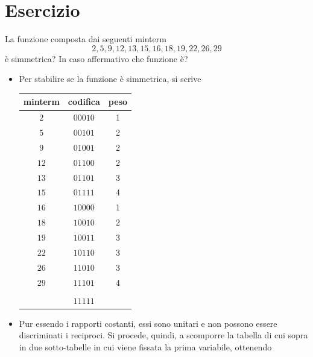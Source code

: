 \documentclass[a4paper]{extarticle}
\renewcommand\arraystretch{}
\begin{document}
\noindent
\section{Esercizio}
La funzione composta dai seguenti minterm
\[2, 5, 9, 12 ,13 ,15 ,16 ,18 ,19 ,22 ,26 ,29\]
è simmetrica? In caso affermativo che funzione è?

\begin{itemize}
    \item Per stabilire se la funzione è simmetrica, si scrive

    \noindent
    \begin{table}[H]
    \setlength{\tabcolsep}{4pt}
    \renewcommand{\arraystretch}{1}
    \centering
    \begin{tabular}{|c|c|c|}
        minterm & codifica & peso\\
        \hline
        $2$ & $00010$ & 1\\
        $5$ & $00101$ & 2\\
        $9$ & $01001$ & 2\\
        $12$ & $01100$ & 2\\
        $13$ & $01101$ & 3\\
        $15$ & $01111$ & 4\\
        $16$ & $10000$ & 1\\
        $18$ & $10010$ & 2\\
        $19$ & $10011$ & 3\\
        $22$ & $10110$ & 3\\
        $26$ & $11010$ & 3\\
        $29$ & $11101$ & 4\\
        \hline
         & & \\
         & $11111$ & \\
    \end{tabular}
    \end{table}

    \item Pur essendo i rapporti costanti, essi sono unitari e non possono essere discriminati i reciproci. Si procede, quindi, a scomporre la tabella di cui sopra in due sotto-tabelle in cui viene fissata la prima variabile, ottenendo
    

\end{itemize}
\end{document}
